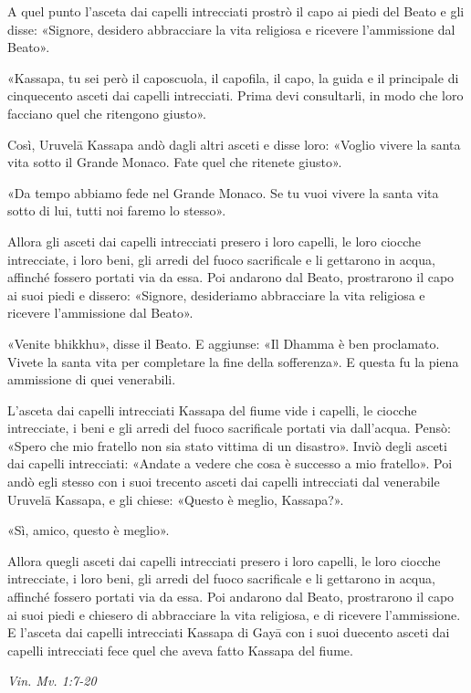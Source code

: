 A quel punto l’asceta dai capelli intrecciati prostrò il capo ai piedi
del Beato e gli disse: «Signore, desidero abbracciare la vita religiosa
e ricevere l’ammissione dal Beato».


«Kassapa, tu sei però il caposcuola, il capofila, il capo, la guida e il
principale di cinquecento asceti dai capelli intrecciati. Prima devi
consultarli, in modo che loro facciano quel che ritengono giusto».


Così, Uruvelā Kassapa andò dagli altri asceti e disse loro: «Voglio
vivere la santa vita sotto il Grande Monaco. Fate quel che ritenete
giusto».


«Da tempo abbiamo fede nel Grande Monaco. Se tu vuoi vivere la santa
vita sotto di lui, tutti noi faremo lo stesso».


Allora gli asceti dai capelli intrecciati presero i loro capelli, le
loro ciocche intrecciate, i loro beni, gli arredi del fuoco sacrificale
e li gettarono in acqua, affinché fossero portati via da essa. Poi
andarono dal Beato, prostrarono il capo ai suoi piedi e dissero:
«Signore, desideriamo abbracciare la vita religiosa e ricevere
l’ammissione dal Beato».


«Venite bhikkhu», disse il Beato. E aggiunse: «Il Dhamma è ben
proclamato. Vivete la santa vita per completare la fine della
sofferenza». E questa fu la piena ammissione di quei venerabili.


L’asceta dai capelli intrecciati Kassapa del fiume vide i capelli, le
ciocche intrecciate, i beni e gli arredi del fuoco sacrificale portati
via dall’acqua. Pensò: «Spero che mio fratello non sia stato vittima di
un disastro». Inviò degli asceti dai capelli intrecciati: «Andate a
vedere che cosa è successo a mio fratello». Poi andò egli stesso con i
suoi trecento asceti dai capelli intrecciati dal venerabile Uruvelā
Kassapa, e gli chiese: «Questo è meglio, Kassapa?».


«Sì, amico, questo è meglio».


Allora quegli asceti dai capelli intrecciati presero i loro capelli, le
loro ciocche intrecciate, i loro beni, gli arredi del fuoco sacrificale
e li gettarono in acqua, affinché fossero portati via da essa. Poi
andarono dal Beato, prostrarono il capo ai suoi piedi e chiesero di
abbracciare la vita religiosa, e di ricevere l’ammissione. E l’asceta
dai capelli intrecciati Kassapa di Gayā con i suoi duecento asceti dai
capelli intrecciati fece quel che aveva fatto Kassapa del fiume.


\emph{Vin. Mv. 1:7-20}



